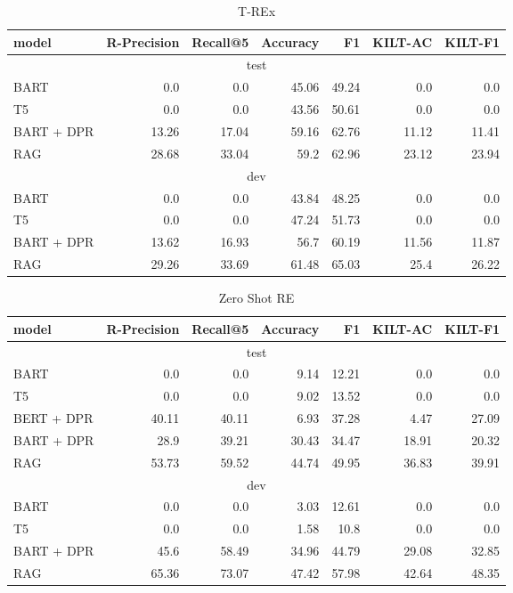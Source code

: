 \documentclass[11pt]{article}
\begin{document}
 \begin{table*}[ht]
\centering
\begin{tabular}{l@{\hskip 2em}rrrrrr}
 \toprule
model & \textbf{R-Precision} & \textbf{Recall@5} & \textbf{Accuracy} & \textbf{F1}  & \textbf{KILT-AC}  & \textbf{KILT-F1}  \\
\midrule
\multicolumn{7}{c}{test} \\
\midrule
BART & 0.0 & 0.0 & 45.06 & 49.24 & 0.0 & 0.0 \\ 
T5 & 0.0 & 0.0 & 43.56 & 50.61 & 0.0 & 0.0 \\ 
BART + DPR & 13.26 & 17.04 & 59.16 & 62.76 & 11.12 & 11.41 \\ 
RAG & 28.68 & 33.04 & 59.2 & 62.96 & 23.12 & 23.94 \\ 
\midrule
\multicolumn{7}{c}{dev} \\
\midrule
BART & 0.0 & 0.0 & 43.84 & 48.25 & 0.0 & 0.0 \\ 
T5 & 0.0 & 0.0 & 47.24 & 51.73 & 0.0 & 0.0 \\ 
BART + DPR & 13.62 & 16.93 & 56.7 & 60.19 & 11.56 & 11.87 \\ 
RAG & 29.26 & 33.69 & 61.48 & 65.03 & 25.4 & 26.22 \\ 
\bottomrule
\end{tabular}
\caption{T-REx}
\label{tab:TREx}
\end{table*}
 \begin{table*}[ht]
\centering
\begin{tabular}{l@{\hskip 2em}rrrrrr}
 \toprule
model & \textbf{R-Precision} & \textbf{Recall@5} & \textbf{Accuracy} & \textbf{F1}  & \textbf{KILT-AC}  & \textbf{KILT-F1}  \\
\midrule
\multicolumn{7}{c}{test} \\
\midrule
BART & 0.0 & 0.0 & 9.14 & 12.21 & 0.0 & 0.0 \\ 
T5 & 0.0 & 0.0 & 9.02 & 13.52 & 0.0 & 0.0 \\ 
BERT + DPR & 40.11 & 40.11 & 6.93 & 37.28 & 4.47 & 27.09 \\ 
BART + DPR & 28.9 & 39.21 & 30.43 & 34.47 & 18.91 & 20.32 \\ 
RAG & 53.73 & 59.52 & 44.74 & 49.95 & 36.83 & 39.91 \\ 
\midrule
\multicolumn{7}{c}{dev} \\
\midrule
BART & 0.0 & 0.0 & 3.03 & 12.61 & 0.0 & 0.0 \\ 
T5 & 0.0 & 0.0 & 1.58 & 10.8 & 0.0 & 0.0 \\ 
BART + DPR & 45.6 & 58.49 & 34.96 & 44.79 & 29.08 & 32.85 \\ 
RAG & 65.36 & 73.07 & 47.42 & 57.98 & 42.64 & 48.35 \\ 
\bottomrule
\end{tabular}
\caption{Zero Shot RE}
\label{tab:zsRE}
\end{table*}
\end{document}
